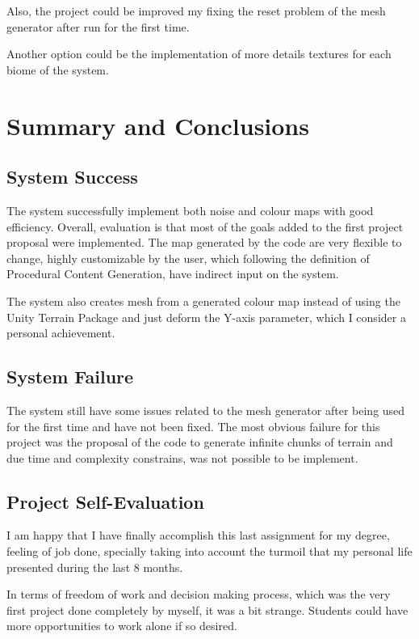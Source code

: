 \documentclass[a4paper,12pt]{book}
\begin{document}
Also, the project could be improved my fixing the reset problem of the mesh generator after run for the first time.

Another option could be the implementation of more details textures for each biome of the system.

\chapter{Summary and Conclusions}
\section{System Success}

The system successfully implement both noise and colour maps with good efficiency. Overall, evaluation is that most of the goals added to the first project proposal were implemented. The map generated by the code are very flexible to change, highly customizable by the user, which following the definition of Procedural Content Generation, have indirect input on the system.

The system also creates mesh from a generated colour map instead of using the Unity Terrain Package and just deform the Y-axis parameter, which I consider a personal achievement. 

\section{System Failure}

The system still have some issues related to the mesh generator after being used for the first time and have not been fixed. The most obvious failure for this project was the proposal of the code to generate infinite chunks of terrain and due time and complexity constrains, was not possible to be implement.

\section{Project Self-Evaluation}

I am happy that I have finally accomplish this last assignment for my degree, feeling of job done, specially taking into account the turmoil that my personal life presented during the last 8 months.

In terms of freedom of work and decision making process, which was the very first project done completely by myself, it was a bit strange. Students could have more opportunities to work alone if so desired.
\end{document}
